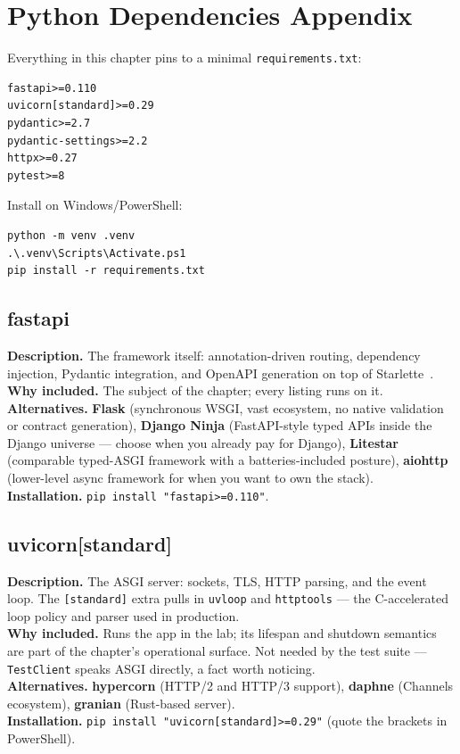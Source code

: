 \section{Python Dependencies Appendix}
\label{sec:ch6-deps}

Everything in this chapter pins to a minimal \texttt{requirements.txt}:

\begin{verbatim}
fastapi>=0.110
uvicorn[standard]>=0.29
pydantic>=2.7
pydantic-settings>=2.2
httpx>=0.27
pytest>=8
\end{verbatim}

Install on Windows/PowerShell:

\begin{verbatim}
python -m venv .venv
.\.venv\Scripts\Activate.ps1
pip install -r requirements.txt
\end{verbatim}

\subsection{fastapi}
\textbf{Description.} The framework itself: annotation-driven routing,
dependency injection, Pydantic integration, and OpenAPI generation on top of
Starlette~\cite{fastapidocs}.\\
\textbf{Why included.} The subject of the chapter; every listing runs on it.\\
\textbf{Alternatives.} \textbf{Flask} (synchronous WSGI, vast ecosystem, no
native validation or contract generation), \textbf{Django Ninja}
(FastAPI-style typed APIs inside the Django universe --- choose when you
already pay for Django), \textbf{Litestar} (comparable typed-ASGI framework
with a batteries-included posture), \textbf{aiohttp} (lower-level async
framework for when you want to own the stack).\\
\textbf{Installation.} \texttt{pip install "fastapi>=0.110"}.

\subsection{uvicorn[standard]}
\textbf{Description.} The ASGI server: sockets, TLS, HTTP parsing, and the
event loop. The \texttt{[standard]} extra pulls in \texttt{uvloop} and
\texttt{httptools} --- the C-accelerated loop policy and parser used in
production.\\
\textbf{Why included.} Runs the app in the lab; its lifespan and shutdown
semantics are part of the chapter's operational surface. Not needed by the
test suite --- \texttt{TestClient} speaks ASGI directly, a fact worth
noticing.\\
\textbf{Alternatives.} \textbf{hypercorn} (HTTP/2 and HTTP/3 support),
\textbf{daphne} (Channels ecosystem), \textbf{granian} (Rust-based server).\\
\textbf{Installation.} \texttt{pip install "uvicorn[standard]>=0.29"} (quote
the brackets in PowerShell).

